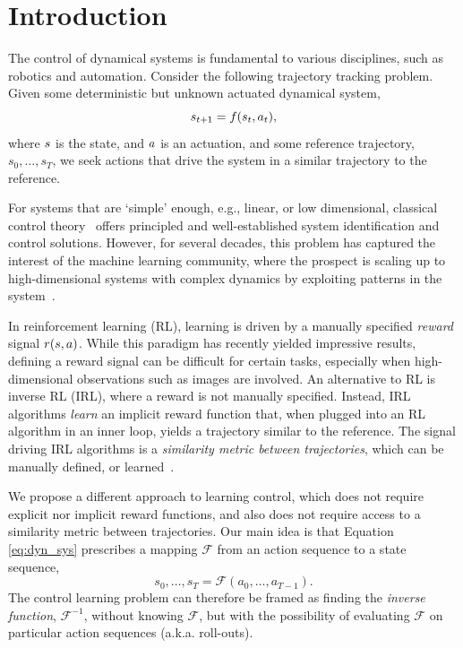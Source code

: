 \documentclass[nohyperref]{article}
\begin{document}
\section{Introduction}\label{s:intro}

The control of dynamical systems is fundamental to various disciplines, such as robotics and automation. Consider the following trajectory tracking problem. Given some deterministic but unknown actuated dynamical system,
\begin{equation}\label{eq:dyn_sys}
    s_{t+1} = f(s_t, a_t),
\end{equation}
where $s$ is the state, and $a$ is an actuation, and some reference trajectory, $s_0,\dots,s_T$, we seek actions that drive the system in a similar trajectory to the reference. 

For systems that are `simple' enough, e.g., linear, or low dimensional, classical control theory~\citep{bertsekas1995dynamic} offers principled and well-established system identification and control solutions. However, for several decades, this problem has captured the interest of the machine learning community, where the prospect is scaling up to high-dimensional systems with complex dynamics by exploiting patterns in the system~\citep{mnih2015human,lillicrap2015continuous}.

In reinforcement learning (RL), learning is driven by a manually specified \textit{reward} signal $r(s,a)$.
While this paradigm has recently yielded impressive results, defining a reward signal can be difficult for certain tasks, especially when high-dimensional observations such as images are involved.
An alternative to RL is inverse RL (IRL), where a reward is not manually specified. Instead, IRL algorithms \textit{learn} an implicit reward function that, when plugged into an RL algorithm in an inner loop, yields a trajectory similar to the reference. The signal driving IRL algorithms is a \textit{similarity metric between trajectories}, which can be manually defined, or learned~\citep{ho2016generative}. 

We propose a different approach to learning control, which does not require explicit nor implicit reward functions, and also does not require access to a similarity metric between trajectories. Our main idea is that Equation \eqref{eq:dyn_sys} prescribes a mapping $\mathcal{F}$ from an action sequence to a state sequence,
\begin{equation}\label{eq:F_mapping}
    s_0,\dots,s_T = \mathcal{F}(a_0,\dots,a_{T-1}).
\end{equation}
The control learning problem can therefore be framed as finding the \textit{inverse function}, $\mathcal{F}^{-1}$, without knowing $\mathcal{F}$, but with the possibility of evaluating $\mathcal{F}$ on particular action sequences (a.k.a. roll-outs).
\end{document}

